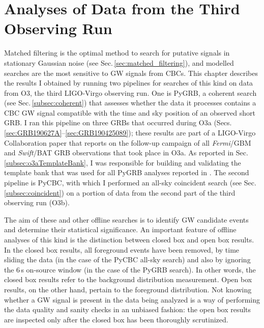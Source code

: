 \documentclass[binding=0.6cm, LaM]{sapthesis}
\begin{document}
\chapter{Analyses of Data from the Third Observing Run}
\label{ch:datanalysis}
	Matched filtering is the optimal method 
	to search for putative signals in stationary Gaussian noise (see Sec.\,\ref{sec:matched_filtering}),
	and modelled searches are the most sensitive to GW signals from CBCs.
        This chapter describes the results I
        obtained by running two pipelines for searches of this kind on data from O3, the third LIGO-Virgo observing run.
        One is {\ttfamily PyGRB}, a coherent search (see Sec.\,\ref{subsec:coherent}) that assesses whether the data it processes contains a CBC GW signal compatible
        with the time and sky position of an observed short GRB.  I ran this pipeline on three GRBs that occurred during O3a (Secs.\,\ref{sec:GRB190627A}--\ref{sec:GRB190425089}); these results are part of a LIGO-Virgo Collaboration paper \cite{43} that reports on the follow-up campaign of all {\it Fermi}/GBM and {\it Swift}/BAT GRB observations that took place in O3a.  As reported in Sec.\,\ref{subsec:o3aTemplateBank}, I was responsible for building and validating the template bank that was used for all {\ttfamily PyGRB} analyses reported in \cite{43}.
        The second pipeline is {\ttfamily PyCBC}, with which I performed an all-sky coincident search (see Sec.\,\ref{subsec:coincident}) on a portion of data from the second part of the third observing run (O3b).

        The aim of these and other offline searches is to identify GW candidate events and determine their statistical significance.
	An important feature of offline analyses of this kind is the distinction between closed box and open box results.
	In the closed box results, all foreground events have been removed, by time sliding the data (in the case of the {\ttfamily PyCBC} all-sky search) and also by ignoring the 6\,s on-source window (in the case of the {\ttfamily PyGRB} search).  In other words, the closed box results refer to the background distribution measurement.
	Open box results, on the other hand, pertain to the foreground distribution.
	Not knowing whether a GW signal is present in the data being analyzed is a way of performing the data quality and sanity checks in an unbiased fashion:
	the open box results are inspected only after the closed box has been thoroughly scrutinized.
	
\end{document}
